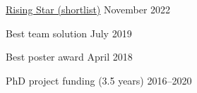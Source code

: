 \documentclass[12pt, a4paper]{article}
\begin{document}

%
          {\href{https://www.dynamonortheast.co.uk/dynamites22-shortlist-unveiled/}%
                {Rising Star (shortlist)}}%
          {November 2022}

%
          {Best team solution}%
          {July 2019}

%
          {Best poster award}%
          {April 2018}

%
          {PhD project funding (3.5 years)}%
          {2016--2020}
\end{document}
